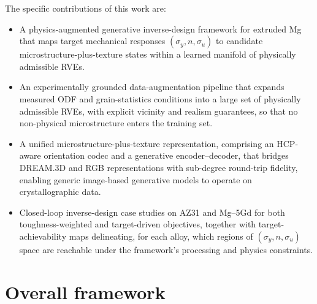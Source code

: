 \documentclass[preprint,12pt]{elsarticle}
\begin{document}
The specific contributions of this work are:
\begin{itemize}
  \item A physics-augmented generative inverse-design framework for extruded Mg that maps target mechanical responses $(\sigma_y, n, \sigma_u)$ to candidate microstructure-plus-texture states within a learned manifold of physically admissible RVEs.
  \item An experimentally grounded data-augmentation pipeline that expands measured ODF and grain-statistics conditions into a large set of physically admissible RVEs, with explicit vicinity and realism guarantees, so that no non-physical microstructure enters the training set.
  \item A unified microstructure-plus-texture representation, comprising an HCP-aware orientation codec and a generative encoder--decoder, that bridges DREAM.3D and RGB representations with sub-degree round-trip fidelity, enabling generic image-based generative models to operate on crystallographic data.
  \item Closed-loop inverse-design case studies on AZ31 and Mg--5Gd for both toughness-weighted and target-driven objectives, together with target-achievability maps delineating, for each alloy, which regions of $(\sigma_y, n, \sigma_u)$ space are reachable under the framework's processing and physics constraints.
\end{itemize}


\section{Overall framework}
\label{sec:framework}
\end{document}
